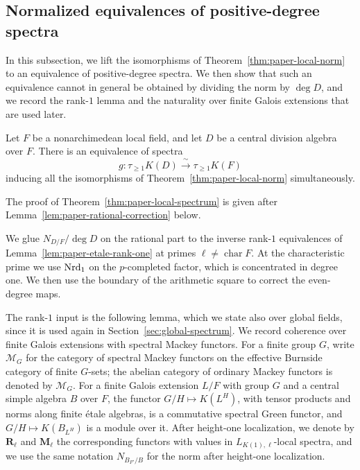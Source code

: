 \subsection{Normalized equivalences of positive-degree spectra}\label{sec:paper-local-spectrum}
In this subsection, we lift the isomorphisms of Theorem~\ref{thm:paper-local-norm} to an equivalence of positive-degree spectra.
We then show that such an equivalence cannot in general be obtained by dividing the norm by $\deg D$, and we record the rank-$1$ lemma and the naturality over finite Galois extensions that are used later.

\begin{theorem}\label{thm:paper-local-spectrum}
Let $F$ be a nonarchimedean local field, and let $D$ be a central division algebra over $F$.
There is an equivalence of spectra
\[
 g\colon\tau_{\ge1}K(D)\xrightarrow{\ \sim\ }\tau_{\ge1}K(F)
\]
inducing all the isomorphisms of Theorem~\ref{thm:paper-local-norm} simultaneously.
\end{theorem}
The proof of Theorem~\ref{thm:paper-local-spectrum} is given after Lemma~\ref{lem:paper-rational-correction} below.

We glue $N_{D/F}/\deg D$ on the rational part to the inverse rank-$1$ equivalences of Lemma~\ref{lem:paper-etale-rank-one} at primes $\ell\ne\operatorname{char}F$.
At the characteristic prime we use $\operatorname{Nrd}_1$ on the $p$-completed factor, which is concentrated in degree one.
We then use the boundary of the arithmetic square to correct the even-degree maps.

The rank-$1$ input is the following lemma, which we state also over global fields, since it is used again in Section~\ref{sec:global-spectrum}.
We record coherence over finite Galois extensions with spectral Mackey functors.
For a finite group $G$, write $\mathscr M_G$ for the category of spectral Mackey functors on the effective Burnside category of finite $G$-sets; the abelian category of ordinary Mackey functors is denoted by $\mathcal M_G$.
For a finite Galois extension $L/F$ with group $G$ and a central simple algebra $B$ over $F$, the functor $G/H\mapsto K(L^H)$, with tensor products and norms along finite \'etale algebras, is a commutative spectral Green functor, and $G/H\mapsto K(B_{L^H})$ is a module over it.
After height-one localization, we denote by $\mathbf R_\ell$ and $\mathbf M_\ell$ the corresponding functors with values in $L_{K(1),\ell}$-local spectra, and we use the same notation $N_{B_{F'}/B}$ for the norm after height-one localization.

